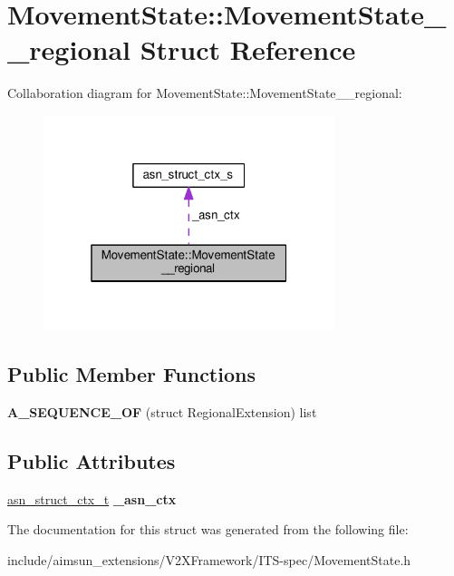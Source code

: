 \hypertarget{structMovementState_1_1MovementState____regional}{}\section{Movement\+State\+:\+:Movement\+State\+\_\+\+\_\+regional Struct Reference}
\label{structMovementState_1_1MovementState____regional}


Collaboration diagram for Movement\+State\+:\+:Movement\+State\+\_\+\+\_\+regional\+:\nopagebreak
\begin{figure}[H]
\begin{center}
\leavevmode
\includegraphics[width=241pt]{structMovementState_1_1MovementState____regional__coll__graph}
\end{center}
\end{figure}
\subsection*{Public Member Functions}
\begin{DoxyCompactItemize}
\item 
{\bfseries A\+\_\+\+S\+E\+Q\+U\+E\+N\+C\+E\+\_\+\+OF} (struct Regional\+Extension) list\hypertarget{structMovementState_1_1MovementState____regional_a979e1577bf1ebfc7a57364d115f93681}{}\label{structMovementState_1_1MovementState____regional_a979e1577bf1ebfc7a57364d115f93681}

\end{DoxyCompactItemize}
\subsection*{Public Attributes}
\begin{DoxyCompactItemize}
\item 
\hyperlink{structasn__struct__ctx__s}{asn\+\_\+struct\+\_\+ctx\+\_\+t} {\bfseries \+\_\+asn\+\_\+ctx}\hypertarget{structMovementState_1_1MovementState____regional_a3911fdc0375a258d738947ac5b5ffb46}{}\label{structMovementState_1_1MovementState____regional_a3911fdc0375a258d738947ac5b5ffb46}

\end{DoxyCompactItemize}


The documentation for this struct was generated from the following file\+:\begin{DoxyCompactItemize}
\item 
include/aimsun\+\_\+extensions/\+V2\+X\+Framework/\+I\+T\+S-\/spec/Movement\+State.\+h\end{DoxyCompactItemize}
